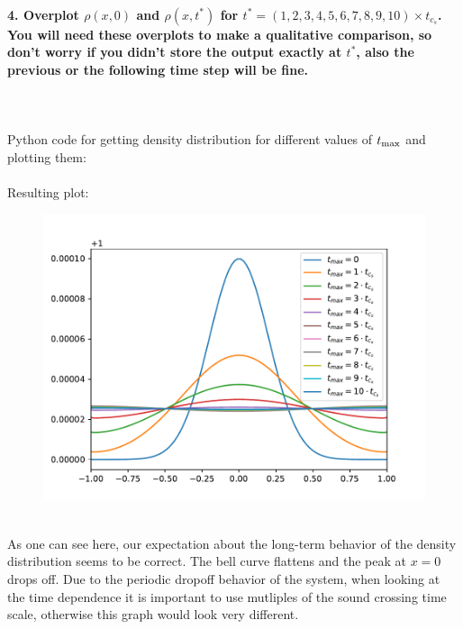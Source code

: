 \paragraph{4. Overplot 
    $\rho(x,0)$ and $\rho(x,t^{*})$ for 
    $t^{*}=(1,2,3,4,5,6,7,8,9,10)\times t_{c_s}$. You will 
    need these overplots to make a qualitative comparison, 
    so don’t worry if you didn’t store the output exactly 
    at $t^{*}$, also the previous or the following time 
    step will be fine.
} \ \\
    \\
    Python code for getting density distribution for 
    different values of $t_\textnormal{max}$ and 
    plotting them: \\
     \ \\
    Resulting plot:
    \begin{figure}[h!]
        \centering
        \includegraphics[width=.7\textwidth]{../figures/density_evolution.pdf}
    \end{figure} \ \\ 
    As one can see here, our expectation about the
    long-term behavior of the density distribution seems
    to be correct. The bell curve flattens and the 
    peak at $x=0$ drops off. Due to the periodic 
    dropoff behavior of the system, when looking at 
    the time dependence it is important to use mutliples 
    of the sound crossing time scale, otherwise this 
    graph would look very different.

\newpage
